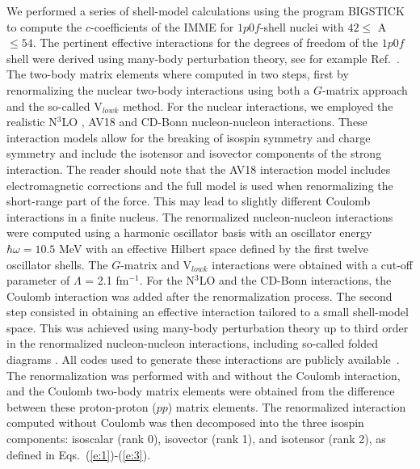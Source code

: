 \documentclass[10pt,showpacs,preprintnumbers,footinbib,amsmath,amssymb,aps,prl,twocolumn,groupedaddress,superscriptaddress,showkeys]{revtex4-1}
\begin{document}
We performed a series of shell-model calculations using the program
BIGSTICK to compute the $c$-coefficients of the IMME for $1p0f$-shell
nuclei with $ 42 \le $ A $ \le 54$. The pertinent effective
interactions for the degrees of freedom of the $1p0f$ shell were
derived using many-body perturbation theory, see for example
Ref.~\cite{mhj1995}. The two-body matrix elements where computed in
two steps, first by renormalizing the nuclear two-body interactions
using both a $G$-matrix approach and the so-called V$_{lowk}$
method. For the nuclear interactions, we employed the realistic
N$^3$LO \cite{entem2003}, AV18 \cite{argonne1995} and CD-Bonn
\cite{cdbonn2001} nucleon-nucleon interactions. These interaction
models allow for the breaking of isospin symmetry and charge symmetry
and include the isotensor and isovector components of the strong
interaction.  The reader should note that the AV18 interaction model includes electromagnetic corrections
and the full model is used when renormalizing the short-range part of the force. 
This may lead to slightly different Coulomb interactions in a finite nucleus. 
The renormalized nucleon-nucleon interactions were
computed using a harmonic oscillator basis with an oscillator energy
$\hbar\omega =10.5$ MeV with an effective Hilbert space defined by the
first twelve oscillator shells. The $G$-matrix and V$_{lowk}$ interactions were
obtained with a cut-off parameter of $\Lambda$ = 2.1 fm$^{-1}$.  For
the N$^3$LO and the CD-Bonn interactions, the Coulomb interaction was
added after the renormalization process.  The second step consisted in
obtaining an effective interaction tailored to a small shell-model
space. This was achieved using many-body perturbation theory up to
third order in the renormalized nucleon-nucleon interactions,
including so-called folded diagrams \cite{mhj1995}. All codes used to
generate these interactions are publicly available~\cite{mhjgit}.  The
renormalization was performed with and without the Coulomb
interaction, and the Coulomb two-body matrix elements were obtained
from the difference between these proton-proton ($pp$) matrix
elements. The renormalized interaction computed without Coulomb was
then decomposed into the three isospin components: isoscalar (rank 0),
isovector (rank 1), and isotensor (rank 2), as defined in
Eqs.~(\ref{e:1})-(\ref{e:3}).
\end{document}
